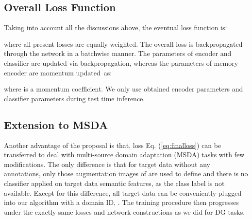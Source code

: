 \documentclass[10pt,twocolumn,letterpaper]{article}
\newcommand{\0}{{\bf 0}}
\begin{document}
\subsection{Overall Loss Function}
Taking into account all the discussions above, the eventual loss function is:

where all present losses are equally weighted. The overall loss is backpropagated through the network in a batchwise manner. The parameters of encoder  and classifier  are updated via backpropagation, whereas the parameters of memory encoder  are momentum updated~as:

where   is a momentum coefficient. We only use obtained encoder parameters  and classifier parameters  during test time inference.

\subsection{Extension to MSDA}\label{sec:msda}
Another advantage of the proposal is that, loss Eq. (\ref{eq:finalloss}) can be transferred to deal with multi-source domain adaptation (MSDA) tasks with few modifications. The only difference is that for target data without any annotations, only those augmentation images of  are used to define  and there is no classifier applied on target data semantic features, as the class label is not available. Except for this difference, all target data can be conveniently plugged into our algorithm with a domain ID, . The training procedure then progresses under the exactly same losses and network constructions as we did for DG tasks.
\end{document}
